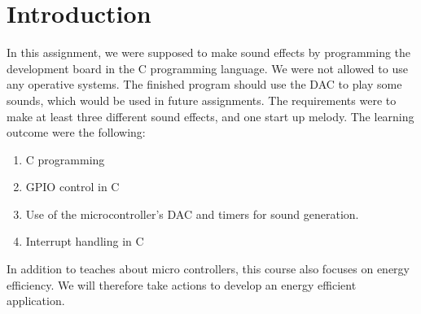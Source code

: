 \section{Introduction}
In this assignment, we were supposed to make sound effects by programming the development board in the C programming language. We were not allowed to use any operative systems. The finished program should use the DAC to play some sounds, which would be used in future assignments. The requirements were to make at least three different sound effects, and one start up melody. The learning outcome were the following:
\begin{enumerate}
	\item{C programming}
	\item{GPIO control in C}
	\item{Use of the microcontroller's DAC and timers for sound generation.}
	\item{Interrupt handling in C}
\end{enumerate}
In addition to teaches about micro controllers, this course also focuses on energy efficiency. We will therefore take actions to develop an energy efficient application. 
